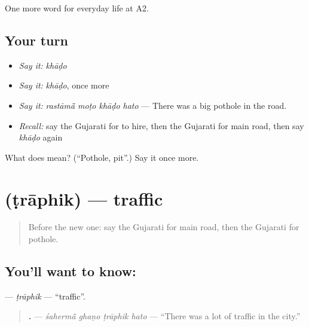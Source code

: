 \begin{grammarlens}[title={What you've built}]
One more word for everyday life at A2.
\end{grammarlens}

\subsection*{Your turn}
\begin{itemize}
\raggedright
  \item \emph{Say it:} \emph{khāḍo}
  \item \emph{Say it:} \emph{khāḍo}, once more
  \item \emph{Say it:} \emph{rastāmā̃ moṭo khāḍo hato} — There was a big pothole in the road.
  \item \emph{Recall:} say the Gujarati for to hire, then the Gujarati for main road, then say \emph{khāḍo} again
\end{itemize}

\begin{tcolorbox}[breakable,colback=teal!4,colframe=teal!35!black,title={Before you move on}]
What does  mean? (\textquotedblleft{}Pothole, pit\textquotedblright{}.) Say it once more.
\end{tcolorbox}
\section[\texorpdfstring{\gu{ટ્રાફિક} (ṭrāphik)}{ટ્રાફિક (ṭrāphik)}]{ (ṭrāphik) — traffic}

\label{lesson:GU-C208-traphik}



\begin{quote}
Before the new one: say the Gujarati for main road, then the Gujarati for pothole.
\end{quote}

\subsection*{You'll want to know: }
\textbf{} — \emph{ṭrāphik} — \textquotedblleft{}traffic\textquotedblright{}.

\begin{quote}
\textbf{   .} — \emph{śahermā̃ ghaṇo ṭrāphik hato} — \textquotedblleft{}There was a lot of traffic in the city.\textquotedblright{}
\end{quote}

